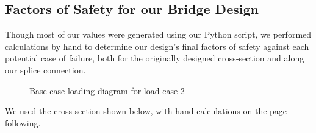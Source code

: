 \documentclass[11pt]{article}
\begin{document}
\subsection{Factors of Safety for our Bridge Design}
Though most of our values were generated using our Python script, we performed calculations by hand to determine our design's final factors of safety against each potential case of failure, both for the originally designed cross-section and along our splice connection.
\begin{figure}[H]
\centering
{}
\caption{Base case loading diagram for load case 2}
\label{fig:load_case_2}
\end{figure}
We used the cross-section shown below, with hand calculations on the page following.
\end{document}
